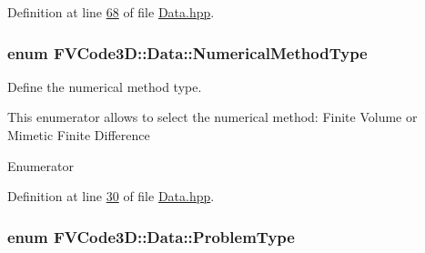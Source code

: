 Definition at line \hyperlink{Data_8hpp_source_l00068}{68} of file \hyperlink{Data_8hpp_source}{Data.\+hpp}.

\subsubsection[{\texorpdfstring{Numerical\+Method\+Type}{NumericalMethodType}}]{\setlength{\rightskip}{0pt plus 5cm}enum {\bf F\+V\+Code3\+D\+::\+Data\+::\+Numerical\+Method\+Type}}\hypertarget{classFVCode3D_1_1Data_a5222e1901276af4586befd821445c6cf}{}\label{classFVCode3D_1_1Data_a5222e1901276af4586befd821445c6cf}


Define the numerical method type. 

This enumerator allows to select the numerical method\+: Finite Volume or Mimetic Finite Difference \begin{Desc}
\item[Enumerator]\par
\begin{description}
\item[{\em 
FV\hypertarget{classFVCode3D_1_1Data_a5222e1901276af4586befd821445c6cfae6a9edcfa5768dd3908108c297b413f7}{}\label{classFVCode3D_1_1Data_a5222e1901276af4586befd821445c6cfae6a9edcfa5768dd3908108c297b413f7}
}]\item[{\em 
M\+FD\hypertarget{classFVCode3D_1_1Data_a5222e1901276af4586befd821445c6cfacf4497fa0025d2f6ea6a9b682e384ff3}{}\label{classFVCode3D_1_1Data_a5222e1901276af4586befd821445c6cfacf4497fa0025d2f6ea6a9b682e384ff3}
}]\end{description}
\end{Desc}


Definition at line \hyperlink{Data_8hpp_source_l00030}{30} of file \hyperlink{Data_8hpp_source}{Data.\+hpp}.

\subsubsection[{\texorpdfstring{Problem\+Type}{ProblemType}}]{\setlength{\rightskip}{0pt plus 5cm}enum {\bf F\+V\+Code3\+D\+::\+Data\+::\+Problem\+Type}}\hypertarget{classFVCode3D_1_1Data_af17933074f5acdb699179763e6f43f23}{}\label{classFVCode3D_1_1Data_af17933074f5acdb699179763e6f43f23}


